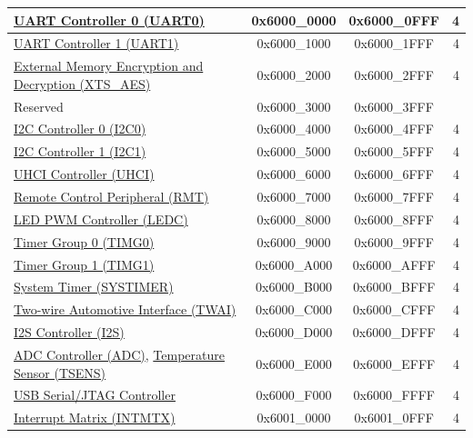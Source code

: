 \begin{ThreePartTable}
\begin{longtable}[c]{ |p{7cm}|c|c|r| }
\hyperref[mod:uart]{UART Controller 0 (UART0)}           & 0x6000\_0000 & 0x6000\_0FFF &   4\\\hline
\hyperref[mod:uart]{UART Controller 1 (UART1)}           & 0x6000\_1000 & 0x6000\_1FFF &   4\\\hline
\hyperref[mod:extmemencr]{External Memory Encryption and Decryption (XTS\_AES)}            & 0x6000\_2000 & 0x6000\_2FFF &   4\\\hline
    \rowcolor{gray!25}  Reserved                    & 0x6000\_3000 & 0x6000\_3FFF &        \\\hline
\hyperref[mod:i2c]{I2C Controller 0 (I2C0)}            & 0x6000\_4000 & 0x6000\_4FFF &   4 \\\hline
\hyperref[mod:i2c]{I2C Controller 1 (I2C1)}            & 0x6000\_5000 & 0x6000\_5FFF &   4 \\\hline
\hyperref[mod:uart]{UHCI Controller (UHCI)}                       & 0x6000\_6000 & 0x6000\_6FFF &   4     \\\hline
\hyperref[mod:rmt]{Remote Control Peripheral (RMT)} & 0x6000\_7000 & 0x6000\_7FFF &   4     \\\hline
\hyperref[mod:ledpwm]{LED PWM Controller (LEDC)} & 0x6000\_8000 & 0x6000\_8FFF &   4     \\\hline
\hyperref[mod:timg]{Timer Group 0 (TIMG0)}              & 0x6000\_9000 & 0x6000\_9FFF &   4     \\\hline
\hyperref[mod:timg]{Timer Group 1 (TIMG1)}              & 0x6000\_A000 & 0x6000\_AFFF &   4     \\\hline

\hyperref[mod:systimer]{System Timer (SYSTIMER)}                & 0x6000\_B000 & 0x6000\_BFFF &   4        \\\hline
\hyperref[mod:twai]{Two-wire Automotive Interface (TWAI)}                      & 0x6000\_C000 & 0x6000\_CFFF &   4        \\\hline
\hyperref[mod:i2s]{I2S Controller (I2S)}            & 0x6000\_D000 & 0x6000\_DFFF &   4     \\\hline
\hyperref[mod:adc]{ADC Controller (ADC)}, \hyperref[mod:tmpsen]{Temperature Sensor (TSENS)}              & 0x6000\_E000 & 0x6000\_EFFF &   4        \\\hline
\hyperref[mod:usbserialjtag]{USB Serial/JTAG Controller}                  & 0x6000\_F000 & 0x6000\_FFFF &   4     \\\hline

\hyperref[mod:intmtrx]{Interrupt Matrix (INTMTX)}            & 0x6001\_0000 & 0x6001\_0FFF &   4     \\\hline


\end{longtable}
\end{ThreePartTable}
